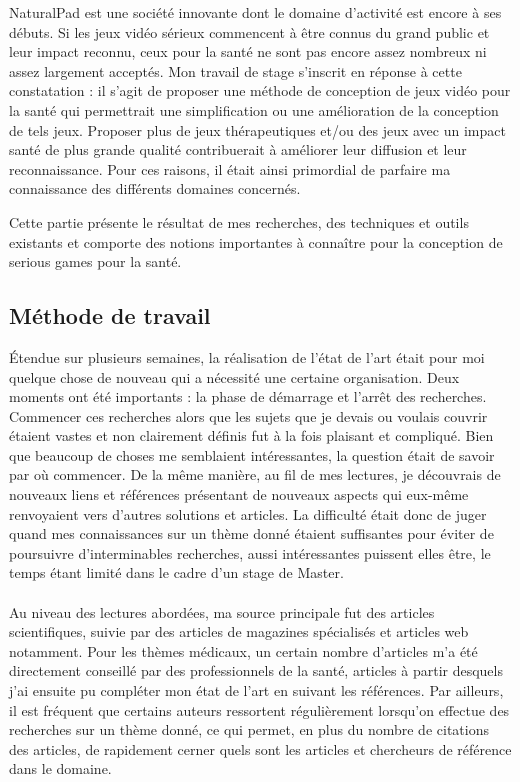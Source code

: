 NaturalPad est une société innovante dont le domaine d'activité est encore à ses débuts. Si les jeux vidéo sérieux commencent à être connus du grand public et leur impact reconnu, ceux pour la santé ne sont pas encore assez nombreux ni assez largement acceptés. Mon travail de stage s'inscrit en réponse à cette constatation : il s'agit de proposer une méthode de conception de jeux vidéo pour la santé qui permettrait une simplification ou une amélioration de la conception de tels jeux. Proposer plus de jeux  thérapeutiques et/ou des jeux avec un impact santé de plus grande qualité contribuerait à améliorer leur diffusion et leur reconnaissance. Pour ces raisons, il était ainsi primordial de parfaire ma connaissance des différents domaines concernés.

Cette partie présente le résultat de mes recherches, des techniques et outils existants et comporte des notions importantes à connaître pour la conception de serious games pour la santé.

\subsection*{Méthode de travail}
Étendue sur plusieurs semaines, la réalisation de l'état de l'art était pour moi quelque chose de nouveau qui a nécessité une certaine organisation. Deux moments ont été importants : la phase de démarrage et l'arrêt des recherches. Commencer ces recherches alors que les sujets que je devais ou voulais couvrir étaient vastes et non clairement définis fut à la fois plaisant et compliqué. Bien que beaucoup de choses me semblaient intéressantes, la question était de savoir par où commencer. De la même manière, au fil de mes lectures, je découvrais de nouveaux liens et références présentant de nouveaux aspects qui eux-même renvoyaient vers d'autres solutions et articles. La difficulté était donc de juger quand mes connaissances sur un thème donné étaient suffisantes pour éviter de poursuivre d'interminables recherches, aussi intéressantes puissent elles être, le temps étant limité dans le cadre d'un stage de Master.
	\paragraph{}Au niveau des lectures abordées, ma source principale fut des articles scientifiques, suivie par des articles de magazines spécialisés et articles web notamment. Pour les thèmes médicaux, un certain nombre d'articles m'a été directement conseillé par des professionnels de la santé, articles à partir desquels j'ai ensuite pu compléter mon état de l'art en suivant les références. Par ailleurs, il est fréquent que certains auteurs ressortent régulièrement lorsqu'on effectue des recherches sur un thème donné, ce qui permet, en plus du nombre de citations des articles, de rapidement cerner quels sont les articles et chercheurs de référence dans le domaine.
